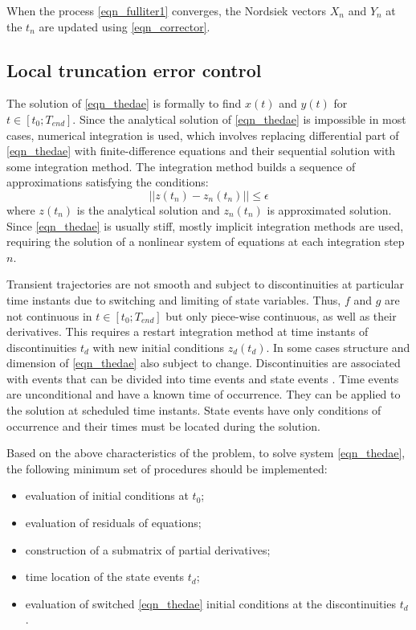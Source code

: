 \documentclass[lettersize,journal]{IEEEtran}
\begin{document}
When the process \eqref{eqn_fulliter1} converges, the Nordsiek vectors \(X_n\) and \(Y_n\) at the \(t_n\) are updated using \eqref{eqn_corrector}.
\subsection{Local truncation error control}




The solution of \eqref{eqn_thedae} is formally to find \(x(t)\) and \(y(t)\) for \(t\in[t_0;T_{end}]\). Since the analytical solution of \eqref{eqn_thedae} is impossible in most cases, numerical integration is used, which involves replacing differential part
of \eqref{eqn_thedae} with finite-difference equations and their sequential solution with some integration
method. The integration method builds a sequence of approximations  satisfying
the conditions:
\begin{equation}
	\label{eqn_fdapprox}
	\vert\vert z(t_n)-z_n(t_n) \vert\vert \leq \epsilon
\end{equation}
\noindent where \(z(t_n)\) is the analytical solution and \(z_n(t_n)\) is approximated solution. Since \eqref{eqn_thedae} is usually stiff,
mostly implicit integration methods are used, requiring the solution of a nonlinear system of equations at each integration step \(n\).

Transient trajectories are not smooth and subject to discontinuities at particular time instants due to switching and limiting of state variables.
Thus, \(f\) and \(g\) are not continuous in \(t\in[t_0;T_{end}]\) but only piece-wise continuous, as well as their derivatives. This requires a restart integration
method at time instants of discontinuities \(t_d\) with new initial conditions \(z_d(t_d)\). In some cases structure and dimension of \eqref{eqn_thedae}
also subject to change. Discontinuities are associated with events that can be divided into time events and state events \cite{texbook}. Time events are 
unconditional and have a known time of occurrence. They can be applied to the solution at scheduled time instants. State events have only conditions of occurrence and
their times must be located during the solution.

Based on the above characteristics of the problem, to solve system \eqref{eqn_thedae}, the following minimum set of procedures should be implemented:
\begin{itemize}
	\item evaluation of initial conditions at \(t_0\);
	\item evaluation of residuals of equations;
	\item construction of a submatrix of partial derivatives;
	\item time location of the state events \(t_d\);
	\item evaluation of switched \eqref{eqn_thedae} initial conditions at the discontinuities \(t_d\).
\end{itemize}
\end{document}
